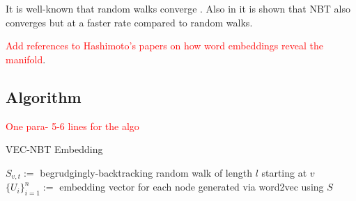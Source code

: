 \documentclass{article} %
\begin{document}
It is well-known that random walks converge \cite{Lovasz}. Also in \cite{NBT-Ihara,Alon} it is shown that NBT also converges but at a faster rate compared to random walks. 

\textcolor{red}{Add references to Hashimoto's papers on how word embeddings reveal the manifold}.

\subsection{Algorithm}
\textcolor{red}{One para- 5-6 lines for the algo}
%

\begin{algorithm}
    \caption{VEC-NBT Embedding}
        {$S_{v,t} := $ begrudgingly-backtracking random walk of length $l$ starting at $v$}
    $\{U_i\}_{i=1}^{n} := $ embedding vector for each node generated via word2vec using $S$\\
\end{algorithm}
\end{document}
